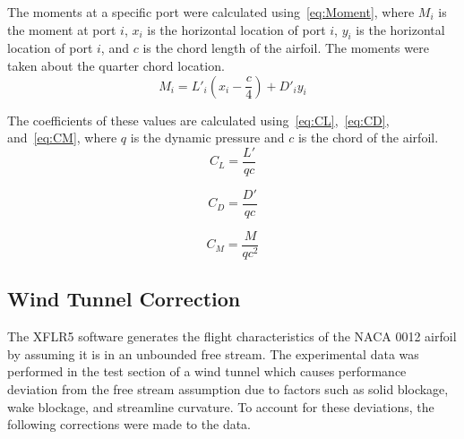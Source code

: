 \documentclass[journal,letterpaper]{IEEEtran}
\begin{document}
The moments at a specific port were calculated using~\eqref{eq:Moment}, where $M_i$ is the moment at port $i$, $x_i$ is the horizontal location of port $i$, $y_i$ is the horizontal location of port $i$, and $c$ is the chord length of the airfoil. The moments were taken about the quarter chord location.
\begin{equation} \label{eq:Moment}
    M_i = L'_i\left(x_i - \frac{c}{4}\right) + D'_iy_i
\end{equation}

The coefficients of these values are calculated using~\eqref{eq:CL},~\eqref{eq:CD}, and~\eqref{eq:CM}, where $q$ is the dynamic pressure and $c$ is the chord of the airfoil.
\begin{equation} \label{eq:CL}
    C_L = \frac{L'}{qc}
\end{equation}

\begin{equation} \label{eq:CD}
    C_D = \frac{D'}{qc}
\end{equation}

\begin{equation} \label{eq:CM}
    C_M = \frac{M}{qc^2}
\end{equation}

\subsection{Wind Tunnel Correction}

The XFLR5 software generates the flight characteristics of the NACA 0012 airfoil by assuming it is in an unbounded free stream.
The experimental data was performed in the test section of a wind tunnel which causes performance deviation from the free stream assumption due to factors such as solid blockage, wake blockage, and streamline curvature.
To account for these deviations, the following corrections were made to the data.
\end{document}

